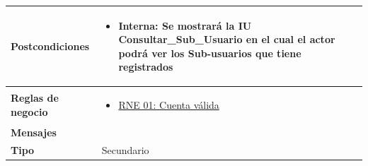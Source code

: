 \begin{center}
\begin{longtable}{| p{3.5cm} | p{11.5cm} |}
          \textbf{Postcondiciones} &
		\begin{itemize}
	              \item Interna: Se mostrará la IU Consultar_Sub_Usuario en el cual el actor podrá ver los Sub-usuarios que tiene registrados
	            \end{itemize} \\
        \hline
          \textbf{Reglas de negocio} & 
		\begin{itemize}
	         	  \item {\hyperref[rnr_01]{RNE 01: Cuenta válida}}
		 \end{itemize} \\
        \hline
          \textbf{Mensajes} & \\
        \hline
          \textbf{Tipo} & Secundario\\
        \hline      
  \end{longtable}
\end{center}
\endgroup

